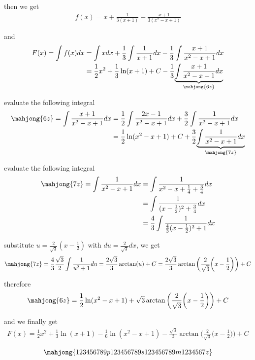\begin{enumerate}
then we get
\begin{align}
f(x)=x+\frac{1}{3(x+1)}-\frac{x+1}{3(x^2-x+1)}
\end{align}

and
\begin{align}
F(x)=\int f(x)dx
&=\int xdx+\frac{1}{3}\int\frac{1}{x+1}dx-\frac{1}{3}\int\frac{x+1}{x^2-x+1}dx \\
&=\frac{1}{2}x^2+\frac{1}{3}\ln(x+1)+C-\frac{1}{3}
\underset{\mahjong{6z}}{\underbrace{\int\frac{x+1}{x^2-x+1}dx}}
\end{align}

evaluate the following integral
\begin{align}
\mahjong{6z}=\int\frac{x+1}{x^2-x+1}dx
&=\frac{1}{2}\int\frac{2x-1}{x^2-x+1}dx+\frac{3}{2}\int\frac{1}{x^2-x+1}dx \\
&=\frac{1}{2}\ln(x^2-x+1)+C+\frac{3}{2}
\underset{\mahjong{7z}}{\underbrace{\int\frac{1}{x^2-x+1}dx}}
\end{align}

evaluate the following integral
\begin{align}
\mahjong{7z}=\int\frac{1}{x^2-x+1}dx
&=\int\frac{1}{x^2-x+\frac{1}{4}+\frac{3}{4}}dx \\
&=\int\frac{1}{(x-\frac{1}{2})^2+\frac{3}{4}}dx \\
&=\frac{4}{3}\int\frac{1}{\frac{4}{3}(x-\frac{1}{2})^2+1}dx
\end{align}

substitute $u=\frac{2}{\sqrt{3}}(x-\frac{1}{2})$ with $du=\frac{2}{\sqrt{3}}dx$, we get
\begin{align}
\mahjong{7z}=\frac{4}{3}\frac{\sqrt{3}}{2}\int\frac{1}{u^2+1}du=\frac{2\sqrt{3}}{3}\arctan(u)+C=\frac{2\sqrt{3}}{3}\arctan\bigg(\frac{2}{\sqrt{3}}\bigg(x-\frac{1}{2}\bigg)\bigg)+C
\end{align}

\newpage

therefore
\begin{align}
\mahjong{6z}=\frac{1}{2}\ln(x^2-x+1)+\sqrt{3}\arctan\bigg(\frac{2}{\sqrt{3}}\bigg(x-\frac{1}{2}\bigg)\bigg)+C
\end{align}

and we finally get
\begin{align}
F(x)=\frac{1}{2}x^2+\frac{1}{3}\ln(x+1)-\frac{1}{6}\ln(x^2-x+1)-\frac{\sqrt{3}}{3}\arctan\bigg(\frac{2}{\sqrt{3}}\bigg(x-\frac{1}{2}\bigg)\bigg)+C
\end{align}

\end{enumerate}

\vspace*{\fill}
\begin{align*}
\mahjong{123456789p 123456789s 123456789m 1234567z}
\end{align*}